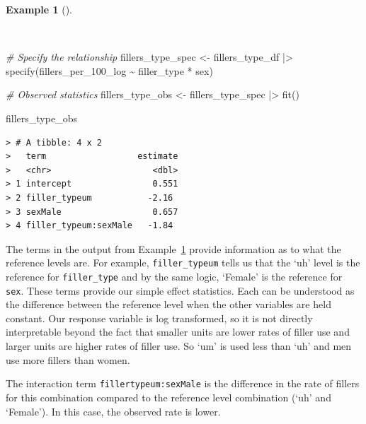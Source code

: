 \documentclass[
  letterpaper,
]{latex/krantz}
\newenvironment{Shaded}{\begin{snugshade}}{\end{snugshade}}
\newcommand{\CommentTok}[1]{\textcolor[rgb]{0.00,0.00,0.00}{\textit{#1}}}
\newcommand{\FunctionTok}[1]{\textcolor[rgb]{0.00,0.00,0.00}{#1}}
\newcommand{\NormalTok}[1]{\textcolor[rgb]{0.00,0.00,0.00}{#1}}
\newcommand{\OtherTok}[1]{\textcolor[rgb]{0.00,0.00,0.00}{#1}}
\newcommand{\SpecialCharTok}[1]{\textcolor[rgb]{0.00,0.00,0.00}{#1}}
\theoremstyle{definition}
\newtheorem{example}{Example}[chapter]
\theoremstyle{remark}
\begin{document}
\begin{example}[]\protect\hypertarget{exm-ida-num-multi-spec}{}\label{exm-ida-num-multi-spec}

~

\begin{Shaded}
\begin{Highlighting}[]
\CommentTok{\# Specify the relationship}
\NormalTok{fillers\_type\_spec }\OtherTok{\textless{}{-}}
\NormalTok{  fillers\_type\_df }\SpecialCharTok{|\textgreater{}}
  \FunctionTok{specify}\NormalTok{(fillers\_per\_100\_log }\SpecialCharTok{\textasciitilde{}}\NormalTok{ filler\_type }\SpecialCharTok{*}\NormalTok{ sex)}

\CommentTok{\# Observed statistics}
\NormalTok{fillers\_type\_obs }\OtherTok{\textless{}{-}}
\NormalTok{  fillers\_type\_spec }\SpecialCharTok{|\textgreater{}}
  \FunctionTok{fit}\NormalTok{()}

\NormalTok{fillers\_type\_obs}
\end{Highlighting}
\end{Shaded}

\begin{verbatim}
> # A tibble: 4 x 2
>   term                  estimate
>   <chr>                    <dbl>
> 1 intercept                0.551
> 2 filler_typeum           -2.16 
> 3 sexMale                  0.657
> 4 filler_typeum:sexMale   -1.84
\end{verbatim}

\end{example}

The terms in the output from Example~\ref{exm-ida-num-multi-spec}
provide information as to what the reference levels are. For example,
\texttt{filler\_typeum} tells us that the `uh' level is the reference
for \texttt{filler\_type} and by the same logic, `Female' is the
reference for \texttt{sex}. These terms provide our simple effect
statistics. Each can be understood as the difference between the
reference level when the other variables are held constant. Our response
variable is log transformed, so it is not directly interpretable beyond
the fact that smaller units are lower rates of filler use and larger
units are higher rates of filler use. So `um' is used less than `uh' and
men use more fillers than women.

The interaction term \texttt{fillertypeum:sexMale} is the difference in
the rate of fillers for this combination compared to the reference level
combination (`uh' and `Female'). In this case, the observed rate is
lower.
\end{document}
